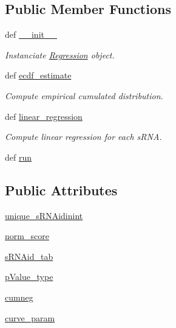 \subsection*{\-Public \-Member \-Functions}
\begin{DoxyCompactItemize}
\item 
def \hyperlink{classirna_1_1iRNA__stat_1_1Regression_1_1Regression_afd64da657ca338bfef0d9a71139c6950}{\-\_\-\-\_\-init\-\_\-\-\_\-}
\begin{DoxyCompactList}\small\item\em \-Instanciate \hyperlink{classirna_1_1iRNA__stat_1_1Regression_1_1Regression}{\-Regression} object. \end{DoxyCompactList}\item 
def \hyperlink{classirna_1_1iRNA__stat_1_1Regression_1_1Regression_aa0bbac9e4ca1689c4cedb40b99dfd8dc}{ecdf\-\_\-estimate}
\begin{DoxyCompactList}\small\item\em \-Compute empirical cumulated distribution. \end{DoxyCompactList}\item 
def \hyperlink{classirna_1_1iRNA__stat_1_1Regression_1_1Regression_a0401cdac99a22870d8a216d730c83ff8}{linear\-\_\-regression}
\begin{DoxyCompactList}\small\item\em \-Compute linear regression for each s\-R\-N\-A. \end{DoxyCompactList}\item 
def \hyperlink{classirna_1_1iRNA__stat_1_1Regression_1_1Regression_a7a7e60bc0864c37488eedd048511fedb}{run}
\end{DoxyCompactItemize}
\subsection*{\-Public \-Attributes}
\begin{DoxyCompactItemize}
\item 
\hyperlink{classirna_1_1iRNA__stat_1_1Regression_1_1Regression_a4372c52d70388f475e06e3e505e972c9}{unique\-\_\-s\-R\-N\-Aidinint}
\item 
\hyperlink{classirna_1_1iRNA__stat_1_1Regression_1_1Regression_ac9fe3b93a439c05b4ea0eec40007c8a6}{norm\-\_\-score}
\item 
\hyperlink{classirna_1_1iRNA__stat_1_1Regression_1_1Regression_a22d09793335db82ba720b179f421a695}{s\-R\-N\-Aid\-\_\-tab}
\item 
\hyperlink{classirna_1_1iRNA__stat_1_1Regression_1_1Regression_a3f48400104c2f4f474f22815fd669025}{p\-Value\-\_\-type}
\item 
\hyperlink{classirna_1_1iRNA__stat_1_1Regression_1_1Regression_ae974f46c06f4da096345e076629b366e}{cumneg}
\item 
\hyperlink{classirna_1_1iRNA__stat_1_1Regression_1_1Regression_a0b0489a329eeb5ab497662662872e07e}{curve\-\_\-param}
\end{DoxyCompactItemize}


